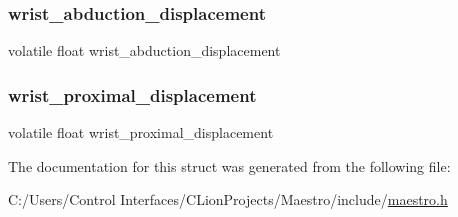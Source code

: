 \subsubsection{\texorpdfstring{wrist\+\_\+abduction\+\_\+displacement}{wrist\_abduction\_displacement}}
{\footnotesize\ttfamily volatile float wrist\+\_\+abduction\+\_\+displacement}

\mbox{\label{struct_maestro_glove_phalanges_a3dba2ad5e29c82bb998d5df69bd1aa4a}} 
\subsubsection{\texorpdfstring{wrist\+\_\+proximal\+\_\+displacement}{wrist\_proximal\_displacement}}
{\footnotesize\ttfamily volatile float wrist\+\_\+proximal\+\_\+displacement}



The documentation for this struct was generated from the following file\+:\begin{DoxyCompactItemize}
\item 
C\+:/\+Users/\+Control Interfaces/\+C\+Lion\+Projects/\+Maestro/include/\hyperlink{maestro_8h}{maestro.\+h}\end{DoxyCompactItemize}
